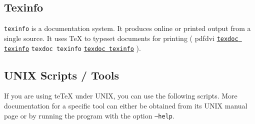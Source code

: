 \documentclass[11pt,a4paper]{article}
\newcommand{\pdfext}{pdf}
\newcommand{\dviext}{dvi}
\newcommand{\dlink}[3]{%
  \ifpdf
    \ifx\pdfext#3
      \href{#1/#2.#3}{\texttt{texdoc #2}}%
    \else
      \texttt{texdoc #2}%
    \fi
  \else
     \href{#1/#2.#3}{\mbox{\texttt{texdoc #2}}}%
  \fi}
\newcommand{\teTeX}{\textrm{te}\TeX\xspace}
\begin{document}
\subsection{Texinfo}
\texttt{texinfo} is a documentation system. It produces online or
printed output from a single source. It uses \TeX{} to typeset
documents for printing (\dlink{../programs}{texinfo}{\dviext}).


\subsection{UNIX Scripts / Tools}

If you are using \teTeX{} under UNIX, you can use the following
scripts. More documentation for a specific tool can either be obtained
from its UNIX manual page or by running the program with the option
\texttt{--help}. 
\end{document}

